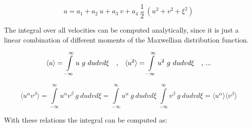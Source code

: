\documentclass[
	pdftex,             %
	12pt,				%
	a4paper,		   	%
	german,				%
	oneside,			%
]{article}
\newcommand{\mom}[1]{\langle #1 \rangle}
\begin{document}
\begin{equation}
a = a_1 + a_2~u + a_3~v + a_4~\frac{1}{2}~(u^2 + v^2 + \xi^2)
\end{equation}

The integral over all velocities can be computed analytically, since it is just a linear combination of different moments of the Maxwellian distribution function.

\begin{equation}
\mom{u} = \int \limits^{\infty}_{-\infty} u ~g~ du dv d\xi
~~~\textnormal{,} ~~~
\mom{u^2} = \int \limits^{\infty}_{-\infty} u^2 ~g~ du dv d\xi
~~~\textnormal{, ...}
\end{equation}

\begin{equation}
\mom{u^\alpha v^\beta}
= 
\int \limits^{\infty}_{-\infty} u^\alpha v^\beta ~g~ du dv d\xi
=
\int \limits^{\infty}_{-\infty} u^\alpha ~g~ du dv d\xi ~ 
\int \limits^{\infty}_{-\infty} v^\beta  ~g~ du dv d\xi
=
\mom{u^\alpha}\mom{v^\beta}
\end{equation}

With these relations the integral can be computed as:
\end{document}
